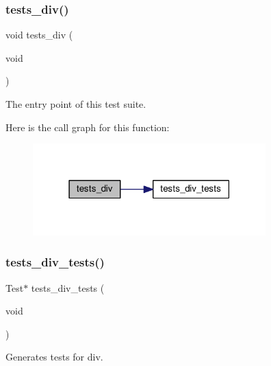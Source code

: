 \subsubsection{\texorpdfstring{tests\+\_\+div()}{tests\_div()}}
{\footnotesize\ttfamily void tests\+\_\+div (\begin{DoxyParamCaption}\item[{void}]{ }\end{DoxyParamCaption})}



The entry point of this test suite. 

Here is the call graph for this function\+:
\nopagebreak
\begin{figure}[H]
\begin{center}
\leavevmode
\includegraphics[width=255pt]{group__unittests_ga1161adbe65ee71e46440423762d1ed8b_cgraph}
\end{center}
\end{figure}
\mbox{\label{group__unittests_ga8e77add06e39b1bb9dbf9004f2ea4c95}} 
\subsubsection{\texorpdfstring{tests\+\_\+div\+\_\+tests()}{tests\_div\_tests()}}
{\footnotesize\ttfamily Test$\ast$ tests\+\_\+div\+\_\+tests (\begin{DoxyParamCaption}\item[{void}]{ }\end{DoxyParamCaption})}



Generates tests for div. 

